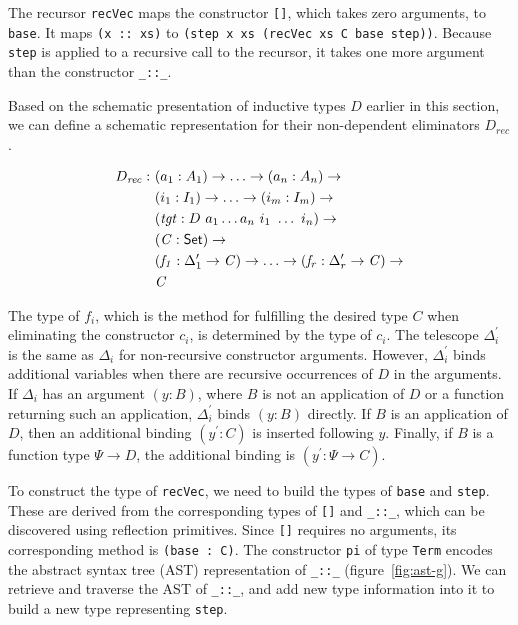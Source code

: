 \documentclass[runningheads]{llncs}
\begin{document}
The recursor \texttt{recVec} maps the constructor {\tt []}, which takes zero arguments, to \texttt{base}.
It maps \texttt{(x :: xs)} to {\tt (step x xs (recVec xs C base step))}.
Because \texttt{step} is applied to a recursive call to the recursor, it takes one more argument than the constructor \texttt{\_::\_}.


Based on the schematic presentation of inductive types $D$ earlier in this section, we can define a schematic representation for their non-dependent eliminators $D_{\mathit{rec}}$.
\begin{center}
\fontsize{7.9pt}{2pt}\selectfont
\begin{align*}
D_{\mathit{rec}} :\ & (a_1 : A_1) \to \ldots \to (a_n : A_n) \to\\
& (i_1 : I_1) \to \ldots \to (i_m : I_m) \to\\
& (\mathit{tgt} : D\ a_1 \ldots a_n\ i_1\ \ldots\ i_n) \to\\
& (\mathit{C} : \textsf{Set}{}) \to \\
& (\mathit{f_1} : \Delta_1^\prime \to \mathit{C}) \to \ldots \to (\mathit{f_r} : \Delta_r^\prime \to \mathit{C}) \to \\
& \mathit{C}
\end{align*}
\end{center}
The type of $f_i$, which is the method for fulfilling the desired type $C$ when eliminating the constructor $c_i$, is determined by the type of $c_i$.
The telescope $\Delta_i^\prime$ is the same as $\Delta_i$ for non-recursive constructor arguments.
However, $\Delta_i^\prime$ binds additional variables when there are recursive occurrences of $D$ in the arguments.
If $\Delta_i$ has an argument $(y : B)$, where $B$ is not an application of $D$ or a function returning such an application, $\Delta_i^\prime$ binds $(y : B)$ directly.
If $B$ is an application of $D$, then an additional binding $(y^\prime : C)$ is inserted following $y$.
Finally, if $B$ is a function type $\Psi \to D$, the additional binding is $(y^\prime : \Psi \to C)$. 

To construct the type of \texttt{recVec}, we need to build the types of {\tt base} and {\tt step}.
These are derived from the corresponding types of \texttt{[]} and \texttt{\_::\_}, which can be discovered using reflection primitives.
Since {\tt []} requires no arguments, its corresponding method is {\tt (base : C)}.
The constructor {\tt pi} of type {\tt Term} encodes the abstract syntax tree (AST) representation of {\tt \_::\_} (figure~\ref{fig:ast-g}). We can retrieve and traverse the AST of {\tt \_::\_}, and add new type information into it to build a new type representing {\tt step}.
\end{document}
